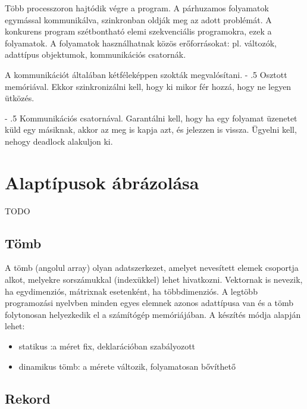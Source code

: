 \documentclass[margin=0px]{article}
\makeatletter
\renewcommand\paragraph{%
    \@startsection{paragraph}{4}{0mm}%
    {-\baselineskip}%
    {.5\baselineskip}%
    {\normalfont\normalsize\bfseries}}
\makeatother
\begin{document}
Több processzoron hajtódik végre a program. A párhuzamos folyamatok egymással kommunikálva, szinkronban oldják meg az adott problémát. A konkurens program szétbontható elemi szekvenciális programokra, ezek a folyamatok. A folyamatok használhatnak közös erőforrásokat: pl. változók, adattípus  objektumok, kommunikációs csatornák.

A kommunikációt általában kétféleképpen szokták megvalósítani.
\paragraph{Osztott memóriával.} Ekkor szinkronizálni kell, hogy ki mikor fér hozzá, hogy ne legyen ütközés.

\paragraph{Kommunikációs csatornával.} Garantálni kell, hogy ha egy folyamat üzenetet küld egy másiknak, akkor az meg is kapja azt, és jelezzen is vissza. Ügyelni kell, nehogy deadlock alakuljon ki.


\section{Alaptípusok ábrázolása}
TODO

\subsection{Tömb}

A tömb (angolul array) olyan adatszerkezet, amelyet nevesített elemek csoportja alkot, melyekre sorszámukkal (indexükkel) lehet hivatkozni. Vektornak is nevezik, ha egydimenziós, mátrixnak esetenként, ha többdimenziós. A legtöbb programozási nyelvben minden egyes elemnek azonos adattípusa van és a tömb folytonosan helyezkedik el a számítógép memóriájában. A készítés módja alapján lehet:

\begin{itemize}
    \item	statikus :a méret fix, deklarációban szabályozott
    \item	dinamikus tömb: a mérete változik, folyamatosan bővíthető
\end{itemize}

\subsection{Rekord}
\end{document}
